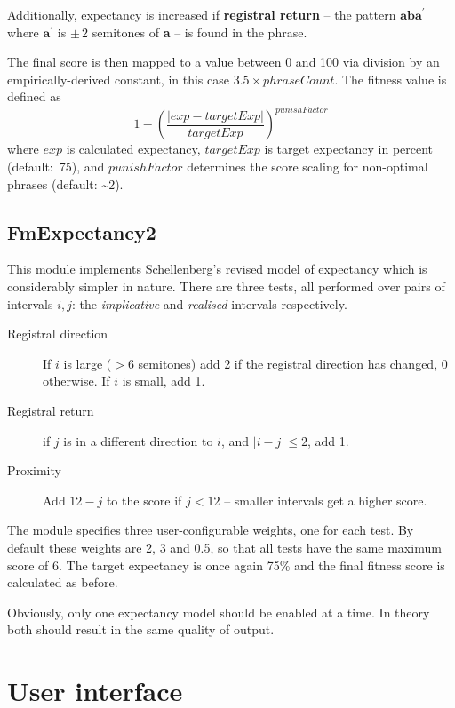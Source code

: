 Additionally, expectancy is increased if \textbf{registral return} -- the pattern $\textbf{aba}^\prime$ where $\textbf{a}^\prime$ is $\pm\, 2$ semitones of \textbf{a} -- is found in the phrase.

The final score is then mapped to a value between 0 and 100 via division by an empirically-derived constant, in this case $3.5 \times phraseCount$. The fitness value is defined as \[ 1 - \left(\frac{|exp - targetExp|}{targetExp}\right)^{punishFactor} \] where $exp$ is calculated expectancy, $targetExp$ is target expectancy in percent (default:~75), and $punishFactor$ determines the score scaling for non-optimal phrases (default: \~{}2).

\subsection{FmExpectancy2}
\label{dev-exp2}

This module implements Schellenberg's revised model of expectancy \citep{schellenberg96} which is considerably simpler in nature. There are three tests, all performed over pairs of intervals $i, j$: the \emph{implicative} and \emph{realised} intervals respectively.

\begin{description}
	\item[Registral direction] If $i$ is large ($> 6$ semitones) add 2 if the registral direction has changed, 0 otherwise. If $i$ is small, add 1.
	\item[Registral return] if $j$ is in a different direction to $i$, and $|i - j| \leq 2$, add 1.
	\item[Proximity] Add $12 - j$ to the score if $j < 12$ -- smaller intervals get a higher score.
\end{description}	

The module specifies three user-configurable weights, one for each test. By default these weights are 2, 3 and 0.5, so that all tests have the same maximum score of 6. The target expectancy is once again 75\% and the final fitness score is calculated as before.

Obviously, only one expectancy model should be enabled at a time. In theory both should result in the same quality of output.

	 
\section{User interface}

